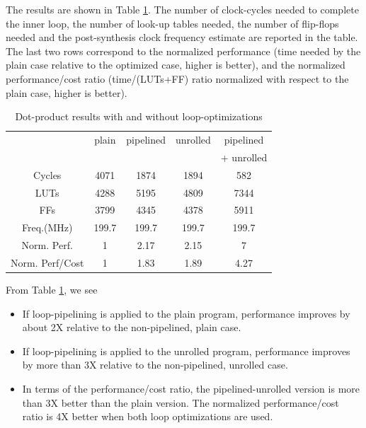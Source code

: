 \documentclass[conference]{IEEEtran}
\begin{document}
The results are shown in Table \ref{table:dotP}.   The number of clock-cycles
needed to complete the inner loop, the number of look-up tables needed, the
 number of flip-flops needed and the post-synthesis clock frequency estimate
are reported in the table.  The last two rows correspond to the normalized
performance (time needed by the plain case relative to the optimized case, higher is better),
and the normalized performance/cost ratio (time/(LUTs+FF)  ratio normalized
with respect to the plain case, higher is better).
\begin{table}[htb]
  \centering
  \caption{Dot-product results with and without loop-optimizations}
  \label{table:dotP}
  \renewcommand\arraystretch{1.2}
  \setlength{\tabcolsep}{1ex}
  \begin{tabular}{c|c|c|c|c}
  \hline
  & plain & pipelined & unrolled & pipelined  \\
  &       &           &          & + unrolled\\
  \hline

Cycles   &    4071  &   1874  &     1894  &     582 \\
LUTs     &   4288   &   5195  &     4809  &    7344 \\
FFs      &    3799  &   4345  &     4378  &    5911 \\
Freq.(MHz)  & 199.7  &    199.7 &      199.7 &    199.7 \\
Norm. Perf. & 1      &  2.17  & 2.15 & 7 \\
Norm. Perf/Cost & 1  &  1.83  & 1.89 & 4.27 \\
\hline
  \end{tabular}
\end{table}

From Table \ref{table:dotP}, we see 
\begin{itemize}
\item If loop-pipelining is 
applied to the plain program, performance improves
by about 2X relative to the non-pipelined, plain case.
\item If loop-pipelining is applied to the unrolled program,
performance improves by more than 3X relative to the non-pipelined,
unrolled case.  
\item In terms of the performance/cost
ratio, the pipelined-unrolled version is more than 3X better than
the plain version.   The normalized performance/cost ratio is 4X
better when both loop optimizations are used.
\end{itemize}
\end{document}
